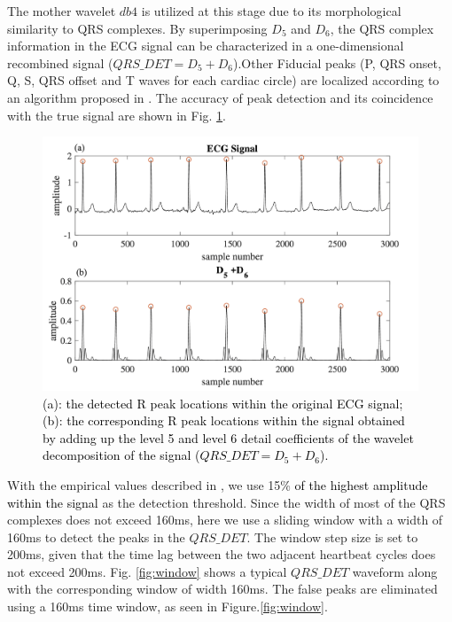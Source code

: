 The mother wavelet $db4$ is utilized at this stage due to its morphological similarity to QRS complexes\cite{martinez2004wavelet}. By superimposing $D_5$ and $D_6$, the QRS complex information in the ECG signal can be characterized in a one-dimensional recombined signal ($QRS\_DET = D_5+D_6$).Other Fiducial peaks (P, QRS onset, Q, S, QRS offset and T waves for each cardiac circle) are localized according to an algorithm proposed in \cite{2012qrs}. The accuracy of peak detection and its coincidence with the true signal are shown in Fig. \ref{fig:QRS_d5d6}.

\begin{figure}[t]
\centering
\includegraphics[scale=.5]{Fig/QRS_D5D6_sub.png}
\caption{\textcolor{black}{(a): the detected R peak locations within the original ECG signal; (b): the corresponding R peak locations within the signal obtained by adding up the level 5 and level 6 detail coefficients of the wavelet decomposition of the signal ($QRS\_DET = D_5+D_6$).} }
\label{fig:QRS_d5d6}
\end{figure}


With the empirical values described in \cite{2012qrs}, we use 15\% \textcolor{black}{of the highest amplitude within the signal} as the detection threshold. Since the width of most of the QRS complexes does not exceed 160ms, here we use a sliding window with a width of 160ms to detect the peaks in the $QRS\_DET$. The window step size is set to 200ms, given that the time lag between the two adjacent heartbeat cycles does not exceed 200ms.  Fig. \ref{fig:window} shows a typical $QRS\_DET$ waveform along with the corresponding window of width 160ms. The false peaks are eliminated using a 160ms time window, as seen in Figure.\ref{fig:window}.


